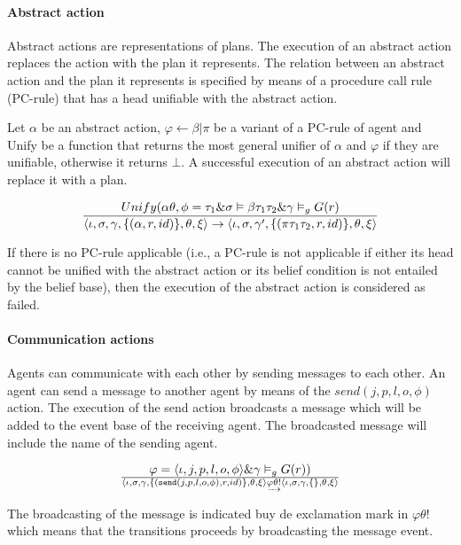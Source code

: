 \documentclass[a4paper]{article}
\begin{document}
\paragraph{Abstract action}

Abstract actions are representations of plans. The execution of an abstract action replaces the action with the plan it represents. The relation between an abstract action and the plan it represents is specified by means of a procedure call rule (PC-rule) that has a head unifiable with the abstract action.

Let $\alpha$ be an abstract action, $\varphi \leftarrow \beta \vert \pi$ be a variant of a PC-rule of agent and Unify be a function that returns the most general unifier of $\alpha$ and $\varphi$ if they are unifiable, otherwise it returns $\bot$. A successful execution of an abstract action will replace it with a plan.

$$ {{Unify(\alpha\theta, \phi = \tau_{1} \& \sigma \vDash \beta\tau_{1}\tau_{2} \& \gamma \vDash_{g} G(r) } \over {\langle \iota, \sigma, \gamma, \{(\alpha, r, id)\}, \theta, \xi \rangle  \rightarrow \langle \iota, \sigma, \gamma', \{(\pi\tau_{1}\tau_{2}, r, id)\}, \theta, \xi \rangle}} $$

If there is no PC-rule applicable (i.e., a PC-rule is not applicable if either its head cannot be unified with the abstract action or its belief condition is not entailed by the belief base), then the execution of the abstract action is considered as failed.

\paragraph{Communication actions}

Agents can communicate with each other by sending messages to each other. An agent can send a message to another agent by means of the $send(j, p, l, o, \phi)$ action. The execution of the send action broadcasts a message which will be added to the event base of the receiving agent. The broadcasted message will include the name of the sending agent.

$$ {\varphi = \langle \iota, j, p, l, o, \phi \rangle} \& \gamma \vDash_{g} G(r))\over{ \langle \iota, \sigma, \gamma, \{(\texttt{send}(j, p, l, o, \phi),r, id)\}, \theta, \xi \rangle \underrightarrow{\varphi\theta!} \langle \iota, \sigma, \gamma, \{\}, \theta, \xi \rangle} $$

The broadcasting of the message is indicated buy de exclamation mark in $\varphi\theta!$ which means that the transitions proceeds by broadcasting the message event.
\end{document}
